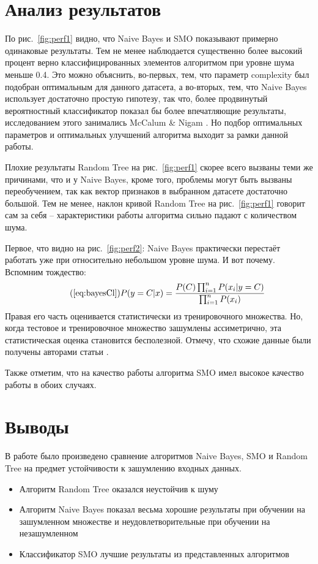 \documentclass{article}
\begin{document}
\section{Анализ результатов}
\par
По рис.~\ref{fig:perf1} видно, что Naive Bayes и SMO показывают примерно одинаковые результаты. Тем не менее наблюдается существенно более высокий процент верно классифицированных элементов алгоритмом при уровне шума меньше 0.4. Это можно объяснить, во-первых, тем, что параметр complexity был подобран оптимальным для данного датасета, а во-вторых, тем, что Naive Bayes использует достаточно простую гипотезу, так что, более продвинутый вероятностный классификатор показал бы более впечатляющие результаты, исследованием этого занимались McCalum \& Nigam \cite{Mccallum1998}. Но подбор оптимальных параметров и оптимальных улучшений алгоритма выходит за рамки данной работы.

Плохие результаты Random Tree на рис.~\ref{fig:perf1} скорее всего вызваны теми же причинами, что и у Naive Bayes, кроме того, проблемы могут быть вызваны переобучением, так как вектор признаков в выбранном датасете достаточно большой. Тем не менее, наклон кривой Random Tree на рис.~\ref{fig:perf1} говорит сам за себя -- характеристики работы алгоритма сильно падают с количеством шума.

Первое, что видно на рис.~\ref{fig:perf2}: Naive Bayes практически перестаёт работать уже при относительно небольшом уровне шума. И вот почему. Вспомним тождество:
\begin{equation}
\tag{\ref{eq:bayesCl}}
P(y=C|x)=\frac{P(C) \prod_{i=1}^n{P(x_i|y=C)}}{\prod_{i=1}^n{P(x_i)}}
\end{equation}
Правая его часть оценивается статистически из тренировочного множества. Но, когда тестовое и тренировочное множество зашумлены ассиметрично, эта статистическая оценка становится бесполезной.
 Отмечу, что схожие данные были получены авторами статьи \cite{glick2004enrichment}. 
 
 Также отметим, что на качество работы алгоритма SMO имел высокое качество работы в обоих случаях.


\section{Выводы}
В работе было произведено сравнение алгоритмов Naive Bayes, SMO и Random Tree на предмет устойчивости к зашумлению входных данных. 
\begin{itemize}
\item{Алгоритм Random Tree оказался неустойчив к шуму}
\item{Алгоритм Naive Bayes показал весьма хорошие результаты при обучении на зашумленном множестве и неудовлетворительные при обучении на незашумленном}
\item{Классификатор SMO лучшие результаты из представленных алгоритмов}
\end{itemize}
\clearpage

{}
\end{document}
